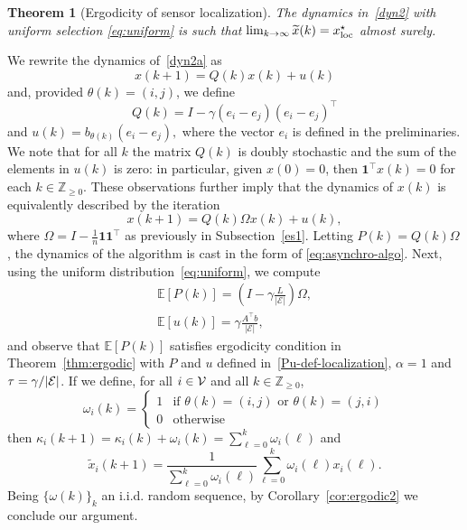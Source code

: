 \documentclass{IEEEtran}
\newtheorem{theorem}{Theorem}
\newcommand{\integernonnegative}{\mathbb{Z}_{\ge 0}}
\def\Exp{\mathbb{E}}
\newcommand{\1}{\mathbf{1}} \newcommand{\ind}{\mathds{1}}
\begin{document}
\begin{theorem}[Ergodicity of sensor localization]
\label{theorem:convforlocal}
The dynamics in~\eqref{dyn2} with uniform selection \eqref{eq:uniform} is such that $\lim_{k\to\infty} \widetilde{x}(k)={x_{\textup{loc}}^{\star}}$
almost surely. 
\end{theorem}
\begin{IEEEproof}
We rewrite the dynamics of~\eqref{dyn2a} as
\begin{equation}\label{eq:dyn3-old}
x(k+1)=Q(k)x(k)+u(k)
\end{equation}
and, provided $\theta(k)=(i,j)$, we define
$$
Q(k)=I-\gamma(e_i-e_j)(e_i-e_j)^\top
$$ 
and
$
u(k)=b_{\theta(k)}(e_i-e_j),
$ 
where the vector $e_i$ is defined in the preliminaries.
We note that  for all $k$ the matrix $Q(k)$ is doubly stochastic and the sum of the elements in $u(k)$ is zero:
in particular, given $x(0)=0$, then $\1^\top x(k)=0$ for each $k\in\integernonnegative$.
These observations further imply that the dynamics of $x(k)$ is equivalently described by the iteration
\begin{equation}
\label{eq:dyn3}
x(k+1)=Q(k)\Omega x(k)+u(k),
\end{equation}
where $\Omega=I-\frac1n\1\1^\top$ as previously in Subsection~\ref{es1}.
Letting $P(k)=Q(k)\Omega$, the dynamics of the algorithm is cast in the form of \eqref{eq:asynchro-algo}.
Next, using the uniform distribution~\eqref{eq:uniform}, we compute
\begin{gather*}
\Exp[P(k)]=\left(I-\gamma\frac{L}{|\mathcal{E}|}\right)\Omega,
\\
\Exp\left[ u(k)\right] = \gamma\frac{A^\top b}{|\mathcal{E}|},
\end{gather*}
and observe that $\Exp[P(k)]$ satisfies ergodicity condition in Theorem~\ref{thm:ergodic} with $P$ and $u$ defined in~\eqref{Pu-def-localization}, $\alpha=1$ and $\tau=\gamma/|\mathcal{E}|$. 
If we define, for all $i\in\mathcal{V}$ and all $k\in\integernonnegative$, $$\omega_i(k)=\begin{cases}
1&\text{if }\theta(k)=(i,j) \text{ or }\theta(k)=(j,i)\\
0&\text{otherwise}
\end{cases}$$
then
$\kappa_{i}(k+1)=\kappa_i(k)+\omega_i(k)=\sum_{\ell=0}^{k}\omega_i(\ell)$
and
$$
\widetilde{x}_{i}(k+1)=\frac{1}{\sum_{\ell=0}^{k}\omega_i(\ell)}\sum_{\ell=0}^{k}\omega_i(\ell)x_i(\ell).
$$
Being $\{\omega(k)\}_k$ an i.i.d. random sequence, by Corollary~\ref{cor:ergodic2} we conclude our argument.
\end{IEEEproof}
\end{document}
